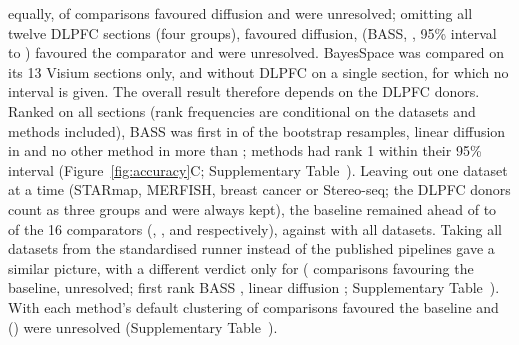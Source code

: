 \documentclass[unnumsec,webpdf,contemporary,large]{oup-authoring-template}
\newcommand{\figref}[1]{Figure~\ref{#1}}
\begin{document}
equally, \vtNBetterD{} of \vtNComp{} comparisons favoured diffusion and \vtNUnresD{} were unresolved; omitting all twelve DLPFC sections (four
groups), \vtNBetterN{} favoured diffusion, \vtNWorseN{} (BASS, \vtBassN, 95\% interval \vtBassNLo{} to \vtBassNHi) favoured the comparator and
\vtNUnresN{} were unresolved. BayesSpace was compared on its 13 Visium sections only, and without DLPFC on a single section, for which no
interval is given. The overall result therefore depends on the DLPFC donors. Ranked on all \rankSections{} sections (rank frequencies are
conditional on the datasets and methods included), BASS was first in \pBestBass{} of the
bootstrap resamples, linear diffusion in \pBestLin{} and no other method in more than \pBestThirdVal; \nTopRank{} methods had rank 1 within
their 95\% interval (\figref{fig:accuracy}C; Supplementary Table~\STranks). Leaving out one dataset at a time (STARmap, MERFISH, breast cancer or Stereo-seq; the DLPFC donors count as three groups and were always kept), the baseline remained ahead of \nDropMin{} to \nDropMax{} of the 16 comparators (\nDropStarmap, \nDropMerfish, \nDropBrca{} and \nDropStereo{} respectively), against \nRobBetter{} with all datasets. Taking all datasets from the standardised
runner instead of the published pipelines gave a similar picture, with a different verdict only for \listRunnerFlip{} (\nRobBetterRunner{} comparisons favouring the baseline,
\nRobUnresRunner{} unresolved; first rank BASS \pBestBassRunner, linear diffusion \pBestLinRunner; Supplementary
Table~\STstatsrunner). With each method's default clustering \nStdBetter{}
of \nStdTot{} comparisons favoured the baseline and \nStdUnres{} (\listStdUnres) were unresolved (Supplementary
Table~\STstats).
\end{document}
